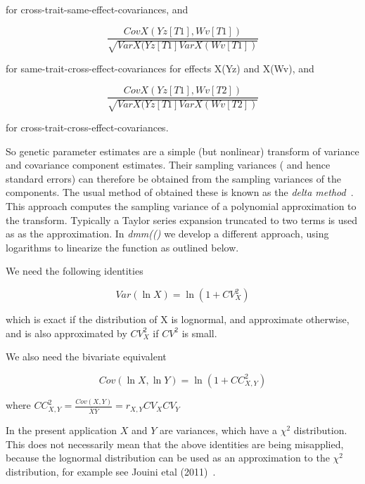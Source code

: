 \documentclass[titlepage]{article}  %
\begin{document}
for cross-trait-same-effect-covariances, and

\begin{displaymath}
\frac{CovX(Yz[T1],Wv[T1])}{\sqrt{VarX(Yz[T1] VarX(Wv[T1])}}
\end{displaymath}

for same-trait-cross-effect-covariances for effects X(Yz) and X(Wv), and

\begin{displaymath}
\frac{CovX(Yz[T1],Wv[T2])}{\sqrt{VarX(Yz[T1] VarX(Wv[T2])}}
\end{displaymath}

for cross-trait-cross-effect-covariances.

So genetic parameter estimates are a simple (but nonlinear) transform of variance and covariance component estimates.  Their sampling variances ( and hence standard errors) can therefore be obtained from the sampling variances of the components. The usual method of obtained these is known as the {\em delta method}~\cite{anon:14}. This approach computes the sampling variance of a polynomial approximation to the transform. Typically a Taylor series expansion truncated to two terms is used as as the approximation. In {\em dmm(()} we develop a different approach, using logarithms to linearize the function as outlined below.

 We need the following identities

\begin{displaymath}
Var(\ln X) = \ln(1 + CV^{2}_{X})
\end{displaymath}

which is exact if the distribution of X is lognormal, and approximate otherwise, and is also approximated by $CV^{2}_{X}$ if $CV^{2}$ is small.

We also need the bivariate equivalent

\begin{displaymath}
Cov(\ln X, \ln Y) = \ln(1 + CC^{2}_{X,Y})
\end{displaymath}

where $ CC^{2}_{X,Y} = \frac{Cov(X,Y)}{\overline{X}\overline{Y}} = r_{X,Y}CV_{X}CV_{Y}$

In the present application $X$ and $Y$ are variances, which have a $\chi^{2}$ distribution. This does not necessarily mean that the above identities are being misapplied, because the lognormal distribution can be used as an approximation to the $\chi^{2}$ distribution, for example see Jouini etal (2011)~\cite{joui:11}.
\end{document}
